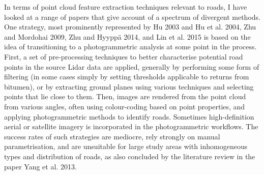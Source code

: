 In terms of point cloud feature extraction techniques relevant to roads, I have looked at a range of papers that give account of a spectrum of divergent methods. One strategy, most prominently represented by Hu 2003 and Hu et al. 2004, Zhu and Mordohai 2009, Zhu and Hyyppä 2014, and Lin et al. 2015 is based on the idea of transitioning to a photogrammetric analysis at some point in the process. First, a set of pre-processing techniques to better characterise potential road points in the source Lidar data are applied, generally by performing some form of filtering (in some cases simply by setting thresholds applicable to returns from bitumen), or by extracting ground planes using various techniques and selecting points that lie close to them. Then, images are rendered from the point cloud from various angles, often using colour-coding based on point properties, and applying photogrammetric methods to identify roads. Sometimes high-definition aerial or satellite imagery is incorporated in the photogrammetric workflows. The success rates of such strategies are mediocre, rely strongly on manual parametrisation, and are unsuitable for large study areas with inhomogeneous types and distribution of roads, as also concluded by the literature review in the paper Yang et al. 2013.

